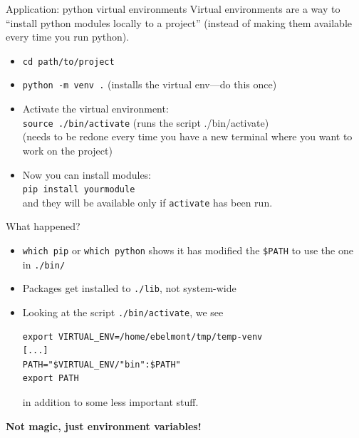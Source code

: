 \documentclass[xcolor={svgnames,x11names,dvipsnames}]{beamer}
\newcommand{\easycmd}[1]{{\tt \color{darkgreen}#1}}
\begin{document}
\begin{frame}[fragile] {Application: python virtual environments}
Virtual environments are a way to ``install python modules locally to a
project'' {(instead of making them available every time you run
python)}.

\vspace{-5pt}
\vspace{-10pt}
\begin{itemize} 
\item \easycmd{cd path/to/project}
\item \easycmd{python -m venv .} {\hspace{20pt} \color{mgray} (installs the virtual
env---do this once)}
\item Activate the virtual environment:
\\\easycmd{source ./bin/activate} {\hspace{20pt} \color{mgray} (runs the script ./bin/activate)}
\\(needs to be redone every time you have a new terminal where you want to work on the project)
\item Now you can install modules:
\\\easycmd{pip install yourmodule}
\\and they will be available only if {\tt activate} has been run.
\end{itemize}

\pause

\vspace{-5pt}
What happened?
\vspace{-10pt}
\begin{itemize} 
\item \easycmd{which pip} or \easycmd{which python} shows it has modified the {\tt \$PATH} to
use the one in {\tt ./bin/}
\item Packages get installed to {\tt ./lib}, not system-wide
\item Looking at the script {\tt ./bin/activate}, we see 
\begin{verbatim}
export VIRTUAL_ENV=/home/ebelmont/tmp/temp-venv
[...]
PATH="$VIRTUAL_ENV/"bin":$PATH"
export PATH
\end{verbatim}
in addition to some less important stuff.
\end{itemize}
\vspace{-10pt}
{\bf Not magic, just environment variables!}
\end{frame}
\end{document}
